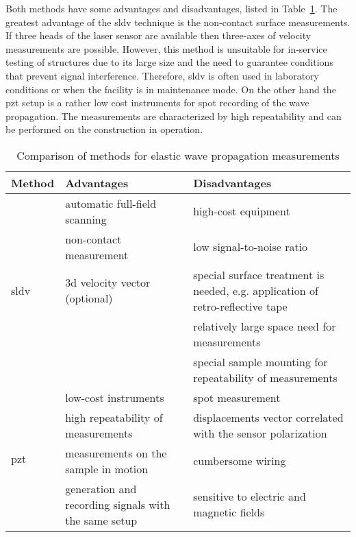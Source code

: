 \documentclass[11pt,a4paper,final]{report}
\theoremstyle{plain}
\begin{document}
Both methods have some advantages and disadvantages, listed in Table~\ref{tab:method_comp}.
The greatest advantage of the \ac{sldv} technique is the non-contact surface measurements.
If three heads of the laser sensor are available then three-axes of velocity measurements are possible.
However, this method is unsuitable for in-service testing of structures due to its large size and the need to guarantee conditions that prevent signal interference. Therefore, \ac{sldv} is often used in laboratory conditions or when the facility is in maintenance mode.
On the other hand the \ac{pzt} setup is a rather low cost instruments for spot recording of the wave propagation.
The measurements are characterized by high repeatability and can be performed on the construction in operation.

\begin{table}[!htb]
	\small
	\tabcolsep=0.2cm
\caption{\label{tab:method_comp}Comparison of methods for elastic wave propagation measurements}
	\begin{tabular}{p{}>{\raggedright}p{}>{\raggedright \arraybackslash}p{}}
		\toprule
		\textbf{Method} &\textbf{Advantages} & \textbf{Disadvantages}\\
		\midrule
		\multirow{5}{*}{\ac{sldv}}   & \tabitem automatic full-field scanning & \tabitem high-cost equipment\\ 
		& \tabitem non-contact measurement & \tabitem low signal-to-noise ratio\\
		& \tabitem \ac{3d} velocity vector (optional)& \tabitem special surface treatment is needed, e.g. application of retro-reflective tape\\
		& & \tabitem relatively large space need for measurements \\
		& & \tabitem special sample mounting for repeatability of measurements\\
		\midrule
		\multirow{5}{*}{\ac{pzt}} & \tabitem low-cost instruments & \tabitem spot measurement\\
		& \tabitem high repeatability of measurements & \tabitem displacements vector correlated with the sensor polarization\\
		& \tabitem measurements on the sample in motion & \tabitem cumbersome wiring\\
		& \tabitem generation and recording signals with the same setup & \tabitem sensitive to electric and magnetic fields\\		
		\bottomrule
	\end{tabular}
\end{table}
\end{document}
